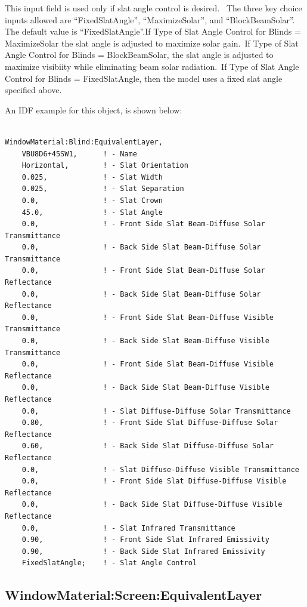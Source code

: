 This input field is used only if slat angle control is desired.~ The three key choice inputs allowed are ``FixedSlatAngle'', ``MaximizeSolar'', and ``BlockBeamSolar''.~ The default value is ``FixedSlatAngle''.If Type of Slat Angle Control for Blinds = MaximizeSolar the slat angle is adjusted to maximize solar gain.~If Type of Slat Angle Control for Blinds = BlockBeamSolar, the slat angle is adjusted to maximize visibiity while eliminating beam solar radiation.~If Type of Slat Angle Control for Blinds = FixedSlatAngle, then the model uses a fixed slat angle specified above.

An IDF example for this object, is shown below:

\begin{lstlisting}

WindowMaterial:Blind:EquivalentLayer,
    VBU8D6+45SW1,      ! - Name
    Horizontal,        ! - Slat Orientation
    0.025,             ! - Slat Width
    0.025,             ! - Slat Separation
    0.0,               ! - Slat Crown
    45.0,              ! - Slat Angle
    0.0,               ! - Front Side Slat Beam-Diffuse Solar Transmittance
    0.0,               ! - Back Side Slat Beam-Diffuse Solar Transmittance
    0.0,               ! - Front Side Slat Beam-Diffuse Solar Reflectance
    0.0,               ! - Back Side Slat Beam-Diffuse Solar Reflectance
    0.0,               ! - Front Side Slat Beam-Diffuse Visible Transmittance
    0.0,               ! - Back Side Slat Beam-Diffuse Visible Transmittance
    0.0,               ! - Front Side Slat Beam-Diffuse Visible Reflectance
    0.0,               ! - Back Side Slat Beam-Diffuse Visible  Reflectance
    0.0,               ! - Slat Diffuse-Diffuse Solar Transmittance
    0.80,              ! - Front Side Slat Diffuse-Diffuse Solar Reflectance
    0.60,              ! - Back Side Slat Diffuse-Diffuse Solar Reflectance
    0.0,               ! - Slat Diffuse-Diffuse Visible Transmittance
    0.0,               ! - Front Side Slat Diffuse-Diffuse Visible Reflectance
    0.0,               ! - Back Side Slat Diffuse-Diffuse Visible Reflectance
    0.0,               ! - Slat Infrared Transmittance
    0.90,              ! - Front Side Slat Infrared Emissivity
    0.90,              ! - Back Side Slat Infrared Emissivity
    FixedSlatAngle;    ! - Slat Angle Control
\end{lstlisting}

\subsection{WindowMaterial:Screen:EquivalentLayer}\label{windowmaterialscreenequivalentlayer}


